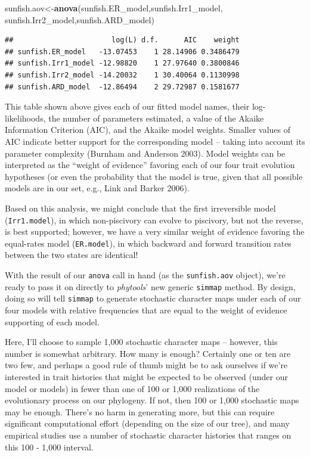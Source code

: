 \documentclass[fleqn,10pt,lineno]{wlpeerj} %
\newenvironment{Shaded}{\begin{snugshade}}{\end{snugshade}}
\newcommand{\FunctionTok}[1]{\textcolor[rgb]{0.13,0.29,0.53}{\textbf{#1}}}
\newcommand{\NormalTok}[1]{#1}
\newcommand{\OtherTok}[1]{\textcolor[rgb]{0.56,0.35,0.01}{#1}}
\begin{document}
\begin{Shaded}
\begin{Highlighting}[]
\NormalTok{sunfish.aov}\OtherTok{\textless{}{-}}\FunctionTok{anova}\NormalTok{(sunfish.ER\_model,sunfish.Irr1\_model,}
\NormalTok{  sunfish.Irr2\_model,sunfish.ARD\_model)}
\end{Highlighting}
\end{Shaded}

\begin{verbatim}
##                       log(L) d.f.      AIC    weight
## sunfish.ER_model   -13.07453    1 28.14906 0.3486479
## sunfish.Irr1_model -12.98820    1 27.97640 0.3800846
## sunfish.Irr2_model -14.20032    1 30.40064 0.1130998
## sunfish.ARD_model  -12.86494    2 29.72987 0.1581677
\end{verbatim}

This table shown above gives each of our fitted model names, their log-likelihoods, the number of parameters estimated, a value of the Akaike Information Criterion (AIC), and the Akaike model weights. Smaller values of AIC indicate better support for the corresponding model -- taking into account its parameter complexity (Burnham and Anderson 2003). Model weights can be interpreted as the ``weight of evidence'' favoring each of our four trait evolution hypotheses (or even the probability that the model is true, given that all possible models are in our set, e.g., Link and Barker 2006).

Based on this analysis, we might conclude that the first irreversible model (\texttt{Irr1.model}), in which non-piscivory can evolve to piscivory, but not the reverse, is best supported; however, we have a very similar weight of evidence favoring the equal-rates model (\texttt{ER.model}), in which backward and forward transition rates between the two states are identical!

With the result of our \texttt{anova} call in hand (as the \texttt{sunfish.aov} object), we're ready to pass it on directly to \emph{phytools}' new generic \texttt{simmap} method. By design, doing so will tell \texttt{simmap} to generate stochastic character maps under each of our four models with relative frequencies that are equal to the weight of evidence supporting of each model.

Here, I'll choose to sample 1,000 stochastic character maps -- however, this number is somewhat arbitrary. How many is enough? Certainly one or ten are two few, and perhaps a good rule of thumb might be to ask ourselves if we're interested in trait histories that might be expected to be observed (under our model or models) in fewer than one of 100 or 1,000 realizations of the evolutionary process on our phylogeny. If not, then 100 or 1,000 stochastic maps may be enough. There's no harm in generating more, but this can require significant computational effort (depending on the size of our tree), and many empirical studies use a number of stochastic character histories that ranges on this 100 - 1,000 interval.
\end{document}
